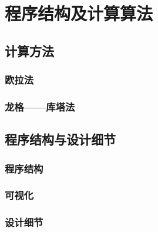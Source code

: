 \documentclass[UTF-8,cs4size]{ctexart}
\begin{document}

\section{程序结构及计算算法}
\subsection{计算方法}
\subsubsection{欧拉法}
\subsubsection{龙格——库塔法}
\subsection{程序结构与设计细节}
\subsubsection{程序结构}
\subsubsection{可视化}
\subsubsection{设计细节}
\end{document}
